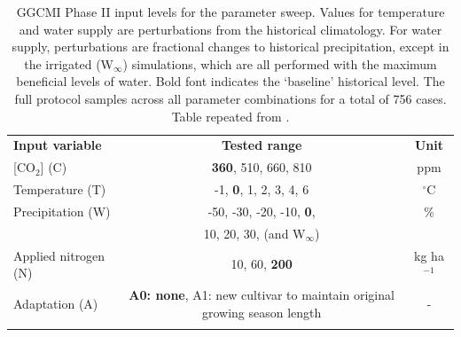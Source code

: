 \documentclass[gmd, manuscript]{copernicus} %
\begin{document}
\begin{table}[ht]
    \caption{
    GGCMI Phase II input levels for the parameter sweep. 
    Values for temperature and water supply are perturbations from the historical climatology. 
    For water supply, perturbations are fractional changes to historical precipitation, except in the irrigated (W$_{\infty}$) simulations, which are all performed with the maximum beneficial levels of water. 
    Bold font indicates the `baseline' historical level. 
    The full protocol samples across all parameter combinations for a total of 756 cases.
    Table repeated from \citet{franke2019ctwnexperiment}.
    }
    \label{table:inputs} 
    \begin{tabular}{lcc} 
        \tophline \vspace{1mm}
        \textbf{Input variable} & \textbf{Tested range} & \textbf{Unit} \\ \middlehline \vspace{1mm}
        [CO$_2$] (C) & \textbf{360}, 510, 660, 810 & ppm\\ \middlehline \vspace{1mm}
        Temperature (T) & -1, \textbf{0}, 1, 2, 3, 4, 6 & $^{\circ}$C\\ \middlehline \vspace{1mm}
        Precipitation (W) & -50, -30, -20, -10, \textbf{0}, & \% \\
        {} & 10, 20, 30, (and W$_{\infty}$) & {} \\ \middlehline \vspace{1mm}
        Applied nitrogen (N) & 10, 60, \textbf{200} & kg ha$^{-1}$ \\ \middlehline \vspace{1mm}
        Adaptation (A) & \textbf{A0: none}, A1: new cultivar to maintain original growing season length & -\\ \bottomhline
    \end{tabular}\\
\end{table}
\end{document}
